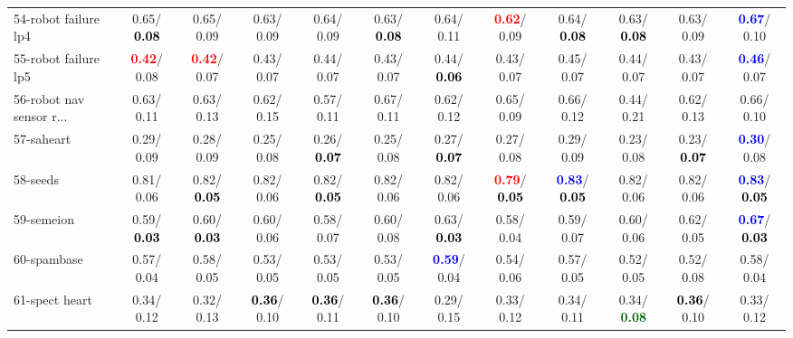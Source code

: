 \begin{table}[h]
\begin{center}
{\begin{tabular}{lc|c|c|c|c|c|c|c|c|c|c}
54-robot failure lp4 &   0.65/\textcolor{black}{\textbf{  0.08}} &   0.65/  0.09 &   0.63/  0.09 &   0.64/  0.09 &   0.63/\textcolor{black}{\textbf{  0.08}} &   0.64/  0.11 & \textcolor{red}{\textbf{  0.62}}/  0.09 &   0.64/\textcolor{black}{\textbf{  0.08}} &   0.63/\textcolor{black}{\textbf{  0.08}} &   0.63/  0.09 & \textcolor{blue}{\textbf{  0.67}}/  0.10 \\
55-robot failure lp5 & \textcolor{red}{\textbf{  0.42}}/  0.08 & \textcolor{red}{\textbf{  0.42}}/  0.07 &   0.43/  0.07 &   0.44/  0.07 &   0.43/  0.07 &   0.44/\textcolor{black}{\textbf{  0.06}} &   0.43/  0.07 &   0.45/  0.07 &   0.44/  0.07 &   0.43/  0.07 & \textcolor{blue}{\textbf{  0.46}}/  0.07 \\
56-robot nav sensor r... &   0.63/  0.11 &   0.63/  0.13 &   0.62/  0.15 &   0.57/  0.11 &   0.67/  0.11 &   0.62/  0.12 &   0.65/  0.09 &   0.66/  0.12 &   0.44/  0.21 &   0.62/  0.13 &   0.66/  0.10 \\
57-saheart &   0.29/  0.09 &   0.28/  0.09 &   0.25/  0.08 &   0.26/\textcolor{black}{\textbf{  0.07}} &   0.25/  0.08 &   0.27/\textcolor{black}{\textbf{  0.07}} &   0.27/  0.08 &   0.29/  0.09 &   0.23/  0.08 &   0.23/\textcolor{black}{\textbf{  0.07}} & \textcolor{blue}{\textbf{  0.30}}/  0.08 \\
58-seeds &   0.81/  0.06 &   0.82/\textcolor{black}{\textbf{  0.05}} &   0.82/  0.06 &   0.82/\textcolor{black}{\textbf{  0.05}} &   0.82/  0.06 &   0.82/  0.06 & \textcolor{red}{\textbf{  0.79}}/\textcolor{black}{\textbf{  0.05}} & \textcolor{blue}{\textbf{  0.83}}/\textcolor{black}{\textbf{  0.05}} &   0.82/  0.06 &   0.82/  0.06 & \textcolor{blue}{\textbf{  0.83}}/\textcolor{black}{\textbf{  0.05}} \\
59-semeion &   0.59/\textcolor{black}{\textbf{  0.03}} &   0.60/\textcolor{black}{\textbf{  0.03}} &   0.60/  0.06 &   0.58/  0.07 &   0.60/  0.08 &   0.63/\textcolor{black}{\textbf{  0.03}} &   0.58/  0.04 &   0.59/  0.07 &   0.60/  0.06 &   0.62/  0.05 & \textcolor{blue}{\textbf{  0.67}}/\textcolor{black}{\textbf{  0.03}} \\
60-spambase &   0.57/  0.04 &   0.58/  0.05 &   0.53/  0.05 &   0.53/  0.05 &   0.53/  0.05 & \textcolor{blue}{\textbf{  0.59}}/  0.04 &   0.54/  0.06 &   0.57/  0.05 &   0.52/  0.05 &   0.52/  0.08 &   0.58/  0.04 \\ \hline
61-spect heart &   0.34/  0.12 &   0.32/  0.13 & \textcolor{black}{\textbf{  0.36}}/  0.10 & \textcolor{black}{\textbf{  0.36}}/  0.11 & \textcolor{black}{\textbf{  0.36}}/  0.10 &   0.29/  0.15 &   0.33/  0.12 &   0.34/  0.11 &   0.34/\textcolor{darkgreen}{\textbf{  0.08}} & \textcolor{black}{\textbf{  0.36}}/  0.10 &   0.33/  0.12 \\

\end{tabular}}
\end{center}
\end{table}
